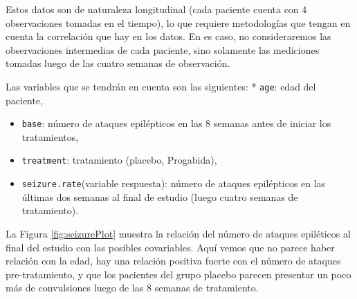 \documentclass[
]{article}
\newenvironment{Shaded}{\begin{snugshade}}{\end{snugshade}}
\newcommand{\AttributeTok}[1]{\textcolor[rgb]{0.13,0.29,0.53}{#1}}
\newcommand{\DecValTok}[1]{\textcolor[rgb]{0.00,0.00,0.81}{#1}}
\newcommand{\FunctionTok}[1]{\textcolor[rgb]{0.13,0.29,0.53}{\textbf{#1}}}
\newcommand{\NormalTok}[1]{#1}
\newcommand{\OtherTok}[1]{\textcolor[rgb]{0.56,0.35,0.01}{#1}}
\newcommand{\SpecialCharTok}[1]{\textcolor[rgb]{0.81,0.36,0.00}{\textbf{#1}}}
\newcommand{\StringTok}[1]{\textcolor[rgb]{0.31,0.60,0.02}{#1}}
\begin{document}
Estos datos son de naturaleza longitudinal (cada paciente cuenta con 4 observaciones tomadas en el tiempo), lo que requiere metodologías que tengan en cuenta la correlación que hay en los datos. En es caso, no consideraremos las observaciones intermedias de cada paciente, sino solamente las mediciones tomadas luego de las cuatro semanas de observación.

Las variables que se tendrán en cuenta son las siguientes:
* \texttt{age}: edad del paciente,

\begin{itemize}
\item
  \texttt{base}: número de ataques epilépticos en las 8 semanas antes de iniciar los tratamientos,
\item
  \texttt{treatment}: tratamiento (placebo, Progabida),
\item
  \texttt{seizure.rate}(variable respuesta): número de ataques epilépticos en las últimas dos semanas al final de estudio (luego cuatro semanas de tratamiento).
\end{itemize}

La Figura \ref{fig:seizurePlot} muestra la relación del número de ataques epiléticos al final del estudio con las posibles covariables. Aquí vemos que no parece haber relación con la edad, hay una relación positiva fuerte con el número de ataques pre-tratamiento, y que los pacientes del grupo placebo parecen presentar un poco más de convulsiones luego de las 8 semanas de tratamiento.

\begin{Shaded}
\end{Shaded}
\end{document}
